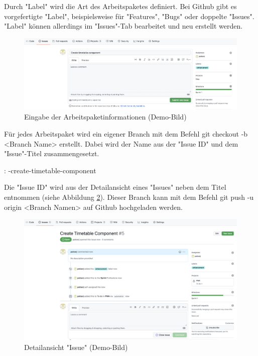 Durch "Label" wird die Art des Arbeitspaketes definiert. Bei Github gibt es vorgefertigte "Label", beispielsweise für "Features", "Bugs" oder doppelte "Issues". "Label" können allerdings im "Issues"-Tab bearbeitet und neu erstellt werden.

\begin{figure}[H]
    \centering
    \includegraphics[width=\textwidth]{media/ProjectManagement/CreateIssue.png}
    \caption{Eingabe der Arbeitspaketinformationen (Demo-Bild)}
    \label{fig:createIssue}
\end{figure}


Für jedes Arbeitspaket wird ein eigener Branch mit dem Befehl {\ttfamily git checkout -b <Branch Name>} erstellt. Dabei wird der Name aus der "Issue ID" und dem "Issue"-Titel zusammengesetzt. 

\zb:
{-create-timetable-component}

Die "Issue ID" wird aus der Detailansicht eines "Issues" neben dem Titel entnommen (siehe Abbildung \ref{fig:issueInfo}). Dieser Branch kann mit dem Befehl {\ttfamily git push -u origin <Branch Namen>} auf Github hochgeladen werden. 

\begin{figure}[H]
    \centering
    \includegraphics[width=\textwidth]{media/ProjectManagement/IssueInfo.png}
    \caption{Detailansicht "Issue" (Demo-Bild)}
    \label{fig:issueInfo}
\end{figure}

